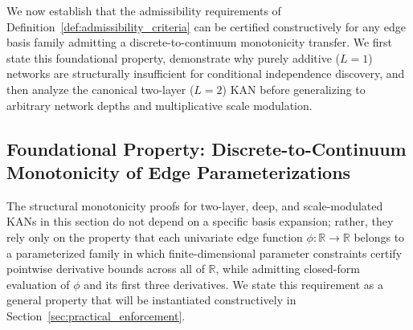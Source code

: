 \documentclass[11pt,a4paper]{article}
\theoremstyle{plain}
\theoremstyle{definition}
\theoremstyle{remark}
\begin{document}
We now establish that the admissibility requirements of Definition~\ref{def:admissibility_criteria} can be certified constructively for any edge basis family admitting a discrete-to-continuum monotonicity transfer. We first state this foundational property, demonstrate why purely additive ($L=1$) networks are structurally insufficient for conditional independence discovery, and then analyze the canonical two-layer ($L=2$) KAN before generalizing to arbitrary network depths and multiplicative scale modulation.

\subsection{Foundational Property: Discrete-to-Continuum Monotonicity of Edge Parameterizations}
\label{subsec:bspline_foundation}

The structural monotonicity proofs for two-layer, deep, and scale-modulated KANs in this section do not depend on a specific basis expansion; rather, they rely only on the property that each univariate edge function $\phi: \mathbb{R} \to \mathbb{R}$ belongs to a parameterized family in which finite-dimensional parameter constraints certify pointwise derivative bounds across all of $\mathbb{R}$, while admitting closed-form evaluation of $\phi$ and its first three derivatives. We state this requirement as a general property that will be instantiated constructively in Section~\ref{sec:practical_enforcement}.
\end{document}
